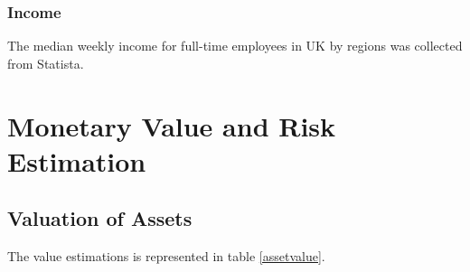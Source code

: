\documentclass[10pt,a4paper]{article}
\begin{document}
\subsubsection{Income}
The median weekly income for full-time employees in UK by regions was collected from Statista.
\cite{fulltime,2022list}

\section{Monetary Value and Risk Estimation}
\subsection{Valuation of Assets}
The value estimations is represented in table \ref{assetvalue}.
\end{document}
